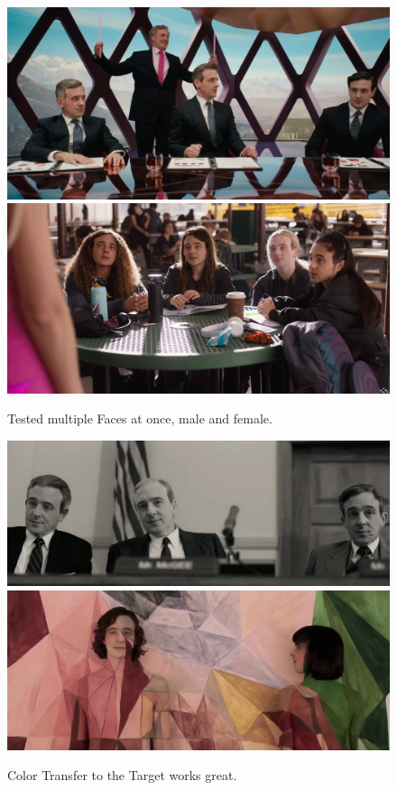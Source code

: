 \documentclass[
  a4paper,  %
  twoside,  %
  bibliography=totoc,
  headsepline,
  cleardoublepage=empty,
  parskip=half,
  draft=false
]{scrbook}
\begin{document}
\begin{figure}[h]
  \centering
  \includegraphics[width=1\textwidth]{./graphics/inswapper/multiple1.png}
  \includegraphics[width=1\textwidth]{./graphics/inswapper/multiple2.png}
  \caption{Tested multiple Faces at once, male and female.}
\end{figure}
\begin{figure}[h]
  \centering
  \includegraphics[width=1\textwidth]{./graphics/inswapper/oppenheimer2.png}
  \includegraphics[width=1\textwidth]{./graphics/inswapper/kimbra.png}
  \caption{Color Transfer to the Target works great.}
\end{figure}
\end{document}
